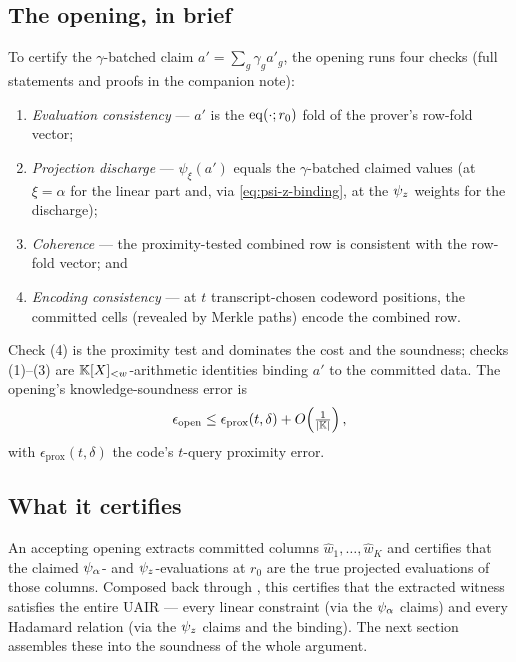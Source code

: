\subsection{The opening, in brief}
\label{sec:pcs-checks}

To certify the $\gamma$-batched claim $a' = \sum_g\gamma_g a'_g$, the opening
runs four checks (full statements and proofs in the companion note):
\begin{enumerate}[leftmargin=2em]
  \item \emph{Evaluation consistency} --- $a'$ is the $\operatorname{eq}(\cdot;r_0)$ fold of the
    prover's row-fold vector;
  \item \emph{Projection discharge} --- $\psi_\xi(a')$ equals the
    $\gamma$-batched claimed values (at $\xi = \alpha$ for the linear part and,
    via \eqref{eq:psi-z-binding}, at the $\psi_{z}$ weights for the discharge);
  \item \emph{Coherence} --- the proximity-tested combined row is consistent with
    the row-fold vector; and
  \item \emph{Encoding consistency} --- at $t$ transcript-chosen codeword
    positions, the committed cells (revealed by Merkle paths) encode the combined
    row.
\end{enumerate}
Check (4) is the proximity test and dominates the cost and the soundness; checks
(1)--(3) are $\mathbb{K}[X]_{<w}$-arithmetic identities binding $a'$ to the committed
data. The opening's knowledge-soundness error is
\[
  \epsilon_{\mathrm{open}} \le
  \epsilon_{\mathrm{prox}}(t,\delta) + O\!\left(\tfrac{1}{|\mathbb{K}|}\right),
\]
with $\epsilon_{\mathrm{prox}}(t,\delta)$ the code's $t$-query proximity error.

\subsection{What it certifies}
\label{sec:pcs-certifies}

An accepting opening extracts committed columns $\widehat w_1,\dots,\widehat w_K$
and certifies that the claimed $\psi_{\alpha}$- and $\psi_{z}$-evaluations at $r_0$ are the
true projected evaluations of those columns. Composed back through
, this certifies that the extracted witness satisfies
the entire UAIR --- every linear constraint (via the $\psi_{\alpha}$ claims) and every
Hadamard relation (via the $\psi_{z}$ claims and the binding). The next section
assembles these into the soundness of the whole argument.
